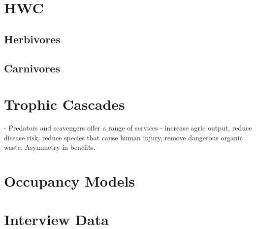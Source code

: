 \section{HWC}

\subsection{Herbivores}

\subsection{Carnivores}

\section{Trophic Cascades}

\cite{O_Bryan_2018} - Predators and scavengers offer a range of services - increase agric output, reduce disease risk, reduce species that cause human injury, remove dangerous organic waste. Asymmetry in benefits.

\section{Occupancy Models}

\section{Interview Data}


